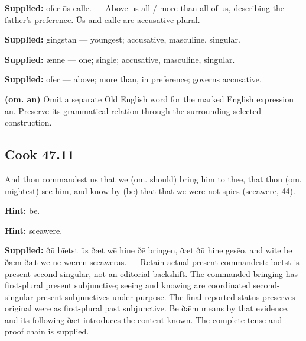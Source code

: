 \textbf{Supplied:} ofer ūs ealle. — Above us all /\allowbreak{} more than all of us, describing the father’s preference. Ūs and ealle are accusative plural.

\textbf{Supplied:} gingstan — youngest; accusative, masculine, singular.

\textbf{Supplied:} ænne — one; single; accusative, masculine, singular.

\textbf{Supplied:} ofer — above; more than, in preference; governs accusative.

\textbf{(om. an)} Omit a separate Old English word for the marked English expression an. Preserve its grammatical relation through the surrounding selected construction.

\par\begin{minipage}{\linewidth}\raggedright
\subsection*{Cook 47.11}

And thou commandest us that we (om. should) bring him to thee, that thou (om. mightest) see him, and know by (be) that that we were not spies (scēawere, 44).

\textbf{Hint:} be.

\textbf{Hint:} scēawere.

\end{minipage}\par\addvspace{4pt}

\textbf{Supplied:} ðū bīetst ūs ðæt wē hine ðē bringen, ðæt ðū hine gesēo, and wite be ðǣm ðæt wē ne wǣren scēaweras. — Retain actual present commandest: bīetst is present second singular, not an editorial backshift. The commanded bringing has first-plural present subjunctive; seeing and knowing are coordinated second-singular present subjunctives under purpose. The final reported status preserves original were as first-plural past subjunctive. Be ðǣm means by that evidence, and its following ðæt introduces the content known. The complete tense and proof chain is supplied.

